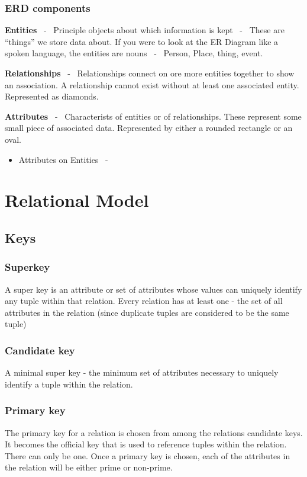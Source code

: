 \documentclass{report}
\begin{document}
    \subsection*{ERD components}
        \item \textbf{Entities} \ - \ Principle objects about which information is kept \ - \ These are ``things'' we store data about. If you were to look at the ER Diagram like a spoken language, the entities are nouns \ - \ Person, Place, thing, event.
        \item \textbf{Relationships} \ - \ Relationships connect on ore more entities together to show an association. A relationship cannot exist without at least one associated entity. Represented as diamonds.
        \item \textbf{Attributes} \ - \ Characterists of entities or of relationships. These represent some small piece of associated data. Represented by either a rounded rectangle or an oval.
            \begin{itemize}[label=$\circ$]
                \item Attributes on Entities \ - \ 
            \end{itemize}

\chapter{Relational Model}
\section{Keys}
\subsection*{Superkey}
A super key is an attribute or set of attributes whose values can uniquely identify any tuple within that relation. Every relation has at least one - the set of all attributes in the relation (since duplicate tuples are considered to be the same tuple)
\subsection*{Candidate key}
A minimal super key - the minimum set of attributes necessary to uniquely identify a tuple within the relation.
\subsection*{Primary key}
The primary key for a relation is chosen from among the relations candidate keys. It becomes the official key that is used to reference tuples within the relation. There can only be one.
\bigbreak \noindent
Once a primary key is chosen, each of the attributes in the relation will be either prime or non-prime.
\end{document}
